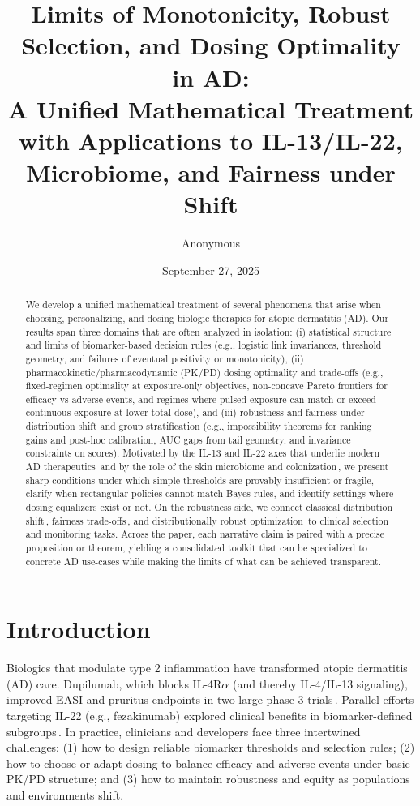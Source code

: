 \documentclass[11pt]{article}
\title{Limits of Monotonicity, Robust Selection, and Dosing Optimality in AD:\\ A Unified Mathematical Treatment with Applications to IL-13/IL-22, Microbiome, and Fairness under Shift}
\author{\normalsize Anonymous}
\date{September 27, 2025}
\numberwithin{equation}{section}
\theoremstyle{plain}
\theoremstyle{definition}
\theoremstyle{remark}
\begin{document}
\sloppy
\maketitle

\begin{abstract}
We develop a unified mathematical treatment of several phenomena that arise when choosing, personalizing, and dosing biologic therapies for atopic dermatitis (AD). Our results span three domains that are often analyzed in isolation: (i) statistical structure and limits of biomarker-based decision rules (e.g., logistic link invariances, threshold geometry, and failures of eventual positivity or monotonicity), (ii) pharmacokinetic/pharmacodynamic (PK/PD) dosing optimality and trade-offs (e.g., fixed-regimen optimality at exposure-only objectives, non-concave Pareto frontiers for efficacy vs adverse events, and regimes where pulsed exposure can match or exceed continuous exposure at lower total dose), and (iii) robustness and fairness under distribution shift and group stratification (e.g., impossibility theorems for ranking gains and post-hoc calibration, AUC gaps from tail geometry, and invariance constraints on scores).
Motivated by the IL-13 and IL-22 axes that underlie modern AD therapeutics\,\cite{SimpsonNEJM2016,FezakinumabJAAD2018} and by the role of the skin microbiome and colonization\,\cite{HuangBleach2011}, we present sharp conditions under which simple thresholds are provably insufficient or fragile, clarify when rectangular policies cannot match Bayes rules, and identify settings where dosing equalizers exist or not. On the robustness side, we connect classical distribution shift\,\cite{DatasetShift2008,BenDavidEtAl2010}, fairness trade-offs\,\cite{KleinbergMullainathanRaghavan2017,HardtEquality2016}, and distributionally robust optimization\,\cite{EsfahaniKuhn2018} to clinical selection and monitoring tasks. Across the paper, each narrative claim is paired with a precise proposition or theorem, yielding a consolidated toolkit that can be specialized to concrete AD use-cases while making the limits of what can be achieved transparent.
\end{abstract}

\section{Introduction}
Biologics that modulate type 2 inflammation have transformed atopic dermatitis (AD) care. Dupilumab, which blocks IL-4R$\alpha$ (and thereby IL-4/IL-13 signaling), improved EASI and pruritus endpoints in two large phase 3 trials\,\cite{SimpsonNEJM2016}. Parallel efforts targeting IL-22 (e.g., fezakinumab) explored clinical benefits in biomarker-defined subgroups\,\cite{FezakinumabJAAD2018}. In practice, clinicians and developers face three intertwined challenges: (1) how to design reliable biomarker thresholds and selection rules; (2) how to choose or adapt dosing to balance efficacy and adverse events under basic PK/PD structure; and (3) how to maintain robustness and equity as populations and environments shift.
\end{document}
